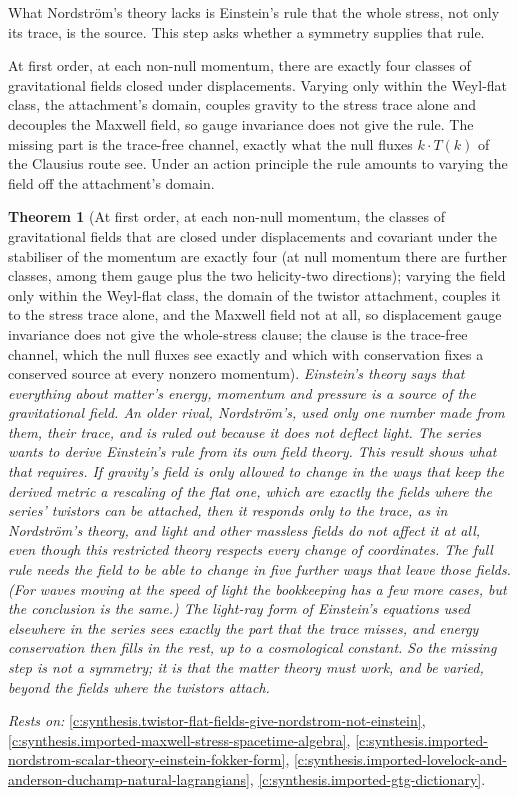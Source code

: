 \documentclass[11pt]{article}
\newtheorem{theorem}{Theorem}[section]
\theoremstyle{definition}
\theoremstyle{plain}
\begin{document}
What Nordstr\"om's theory lacks is Einstein's rule that the whole stress, not only its trace, is the source. This step asks whether a symmetry supplies that rule.

At first order, at each non-null momentum, there are exactly four classes of gravitational fields closed under displacements. Varying only within the Weyl-flat class, the attachment's domain, couples gravity to the stress trace alone and decouples the Maxwell field, so gauge invariance does not give the rule. The missing part is the trace-free channel, exactly what the null fluxes $k \cdot T(k)$ of the Clausius route see. Under an action principle the rule amounts to varying the field off the attachment's domain.

\begin{theorem}[At first order, at each non-null momentum, the classes of gravitational fields that are closed under displacements and covariant under the stabiliser of the momentum are exactly four (at null momentum there are further classes, among them gauge plus the two helicity-two directions); varying the field only within the Weyl-flat class, the domain of the twistor attachment, couples it to the stress trace alone, and the Maxwell field not at all, so displacement gauge invariance does not give the whole-stress clause; the clause is the trace-free channel, which the null fluxes see exactly and which with conservation fixes a conserved source at every nonzero momentum]\label{c:synthesis.weyl-flat-variations-carry-only-the-stress-trace-and-the-whole-stress-clause-is-the-trace-free-channel}
Einstein's theory says that everything about matter's energy, momentum and pressure is a source of the gravitational field. An older rival, Nordstr\"om's, used only one number made from them, their trace, and is ruled out because it does not deflect light. The series wants to derive Einstein's rule from its own field theory. This result shows what that requires. If gravity's field is only allowed to change in the ways that keep the derived metric a rescaling of the flat one, which are exactly the fields where the series' twistors can be attached, then it responds only to the trace, as in Nordstr\"om's theory, and light and other massless fields do not affect it at all, even though this restricted theory respects every change of coordinates. The full rule needs the field to be able to change in five further ways that leave those fields. (For waves moving at the speed of light the bookkeeping has a few more cases, but the conclusion is the same.) The light-ray form of Einstein's equations used elsewhere in the series sees exactly the part that the trace misses, and energy conservation then fills in the rest, up to a cosmological constant. So the missing step is not a symmetry; it is that the matter theory must work, and be varied, beyond the fields where the twistors attach.
\end{theorem}
\noindent\emph{Rests on:} \ref{c:synthesis.twistor-flat-fields-give-nordstrom-not-einstein}, \ref{c:synthesis.imported-maxwell-stress-spacetime-algebra}, \ref{c:synthesis.imported-nordstrom-scalar-theory-einstein-fokker-form}, \ref{c:synthesis.imported-lovelock-and-anderson-duchamp-natural-lagrangians}, \ref{c:synthesis.imported-gtg-dictionary}.
\end{document}
